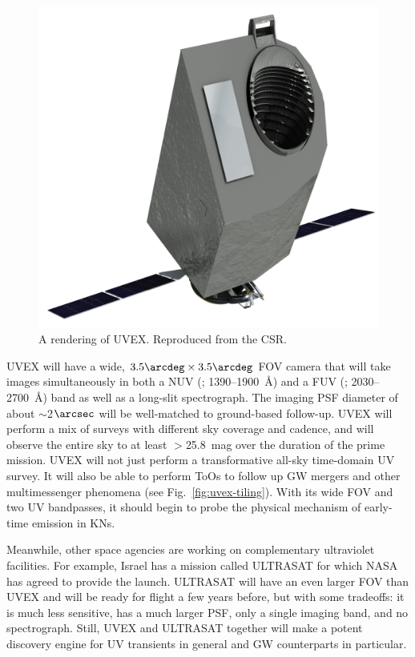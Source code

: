 \documentclass[twocolumn,times]{aastex631}
\begin{document}
\begin{figure}
    \includegraphics[width=\columnwidth]{figures/UVEXrender}
    \caption{\label{fig:render}A rendering of \ac{UVEX}. Reproduced from the \acf{CSR}.}
\end{figure}

\ac{UVEX} will have a wide, $3.5\arcdeg \times 3.5\arcdeg$ \ac{FOV} camera that will take images simultaneously in both a \acl{NUV} (; 1390--1900~\AA) and a \acl{FUV} (; 2030--2700~\AA) band as well as a long-slit spectrograph. The imaging \ac{PSF} diameter of about $\sim$2$\arcsec$ will be well-matched to ground-based follow-up. \ac{UVEX} will perform a mix of surveys with different sky coverage and cadence, and will observe the entire sky to at least $>$25.8~mag over the duration of the prime mission. \ac{UVEX} will not just perform a transformative all-sky time-domain \ac{UV} survey. It will also be able to perform \acp{ToO} to follow up \ac{GW} mergers and other multimessenger phenomena (see Fig.~\ref{fig:uvex-tiling}). With its wide \ac{FOV} and two \ac{UV} bandpasses, it should begin to probe the physical mechanism of early-time emission in \acp{KN}.

Meanwhile, other space agencies are working on complementary ultraviolet facilities. For example, Israel has a mission called ULTRASAT \citep{2024ApJ...964...74S} for which NASA has agreed to provide the launch. ULTRASAT will have an even larger \ac{FOV} than \ac{UVEX} and will be ready for flight a few years before, but with some tradeoffs: it is much less sensitive, has a much larger \ac{PSF}, only a single imaging band, and no spectrograph. Still, \ac{UVEX} and ULTRASAT together will make a potent discovery engine for \ac{UV} transients in general and \ac{GW} counterparts in particular.
\end{document}

